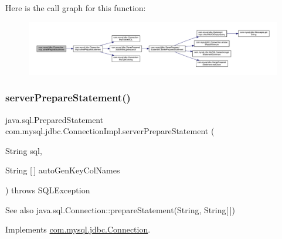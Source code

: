 Here is the call graph for this function\+:\nopagebreak
\begin{figure}[H]
\begin{center}
\leavevmode
\includegraphics[width=350pt]{classcom_1_1mysql_1_1jdbc_1_1_connection_impl_a47beacf4b3a8a745c22fb6f1cd7b8e60_cgraph}
\end{center}
\end{figure}
\mbox{\label{classcom_1_1mysql_1_1jdbc_1_1_connection_impl_a8bfab236948ec5c7432306cf7eebfd12}} 
\subsubsection{\texorpdfstring{server\+Prepare\+Statement()}{serverPrepareStatement()}\hspace{0.1cm}{\footnotesize\ttfamily [6/6]}}
{\footnotesize\ttfamily java.\+sql.\+Prepared\+Statement com.\+mysql.\+jdbc.\+Connection\+Impl.\+server\+Prepare\+Statement (\begin{DoxyParamCaption}\item[{String}]{sql,  }\item[{String \mbox{[}$\,$\mbox{]}}]{auto\+Gen\+Key\+Col\+Names }\end{DoxyParamCaption}) throws S\+Q\+L\+Exception}

\begin{DoxySeeAlso}{See also}
java.\+sql.\+Connection\+::prepare\+Statement(\+String, String\mbox{[}$\,$\mbox{]}) 
\end{DoxySeeAlso}


Implements \mbox{\hyperlink{interfacecom_1_1mysql_1_1jdbc_1_1_connection_a7bbac014ef6bb3ad113c039f71af4bd9}{com.\+mysql.\+jdbc.\+Connection}}.

